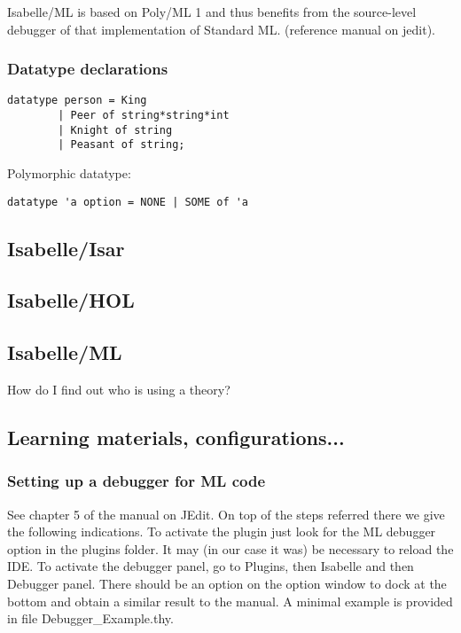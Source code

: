 \documentclass[a4paper,12pt]{article}
\theoremstyle{break}
\theoremstyle{break}
\begin{document}
Isabelle/ML is based on Poly/ML 1 and thus benefits from the source-level
debugger of that implementation of Standard ML. (reference manual on jedit).

\subsubsection{Datatype declarations}

\begin{lstlisting}
datatype person = King	
		| Peer of string*string*int
		| Knight of string
		| Peasant of string;
\end{lstlisting}

Polymorphic datatype:

\begin{lstlisting}
datatype 'a option = NONE | SOME of 'a
\end{lstlisting}


\subsection{Isabelle/Isar}



\subsection{Isabelle/HOL}
\subsection{Isabelle/ML}

How do I find out who is using a theory?

\subsection{Learning materials, configurations...}

\subsubsection{Setting up a debugger for ML code}

See chapter 5 of the manual on JEdit. On top of the steps referred there we give the following indications. To activate the plugin just look for the ML debugger option in the plugins folder. It may (in our case it was) be necessary to reload the IDE. To activate the debugger panel, go to Plugins, then Isabelle and then Debugger panel. There should be an option on the option window to dock at the bottom and obtain a similar result to the manual. A minimal example is provided in file Debugger\_Example.thy.
\end{document}

